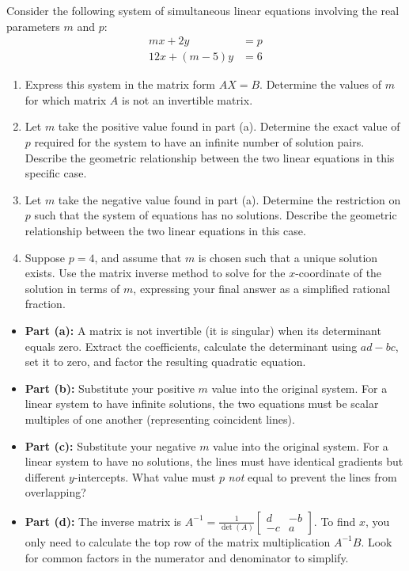 \begin{problem}
Consider the following system of simultaneous linear equations involving the real parameters $m$ and $p$:
\begin{align*}
mx + 2y &= p \\
12x + (m - 5)y &= 6
\end{align*}

\begin{enumerate}[label=\textbf{(\alph*)}]
    \item Express this system in the matrix form $AX = B$. Determine the values of $m$ for which matrix $A$ is not an invertible matrix.
    \item Let $m$ take the positive value found in part (a). Determine the exact value of $p$ required for the system to have an infinite number of solution pairs. Describe the geometric relationship between the two linear equations in this specific case.
    \item Let $m$ take the negative value found in part (a). Determine the restriction on $p$ such that the system of equations has no solutions. Describe the geometric relationship between the two linear equations in this case.
    \item Suppose $p = 4$, and assume that $m$ is chosen such that a unique solution exists. Use the matrix inverse method to solve for the $x$-coordinate of the solution in terms of $m$, expressing your final answer as a simplified rational fraction.
\end{enumerate}
\end{problem}

\begin{hint}
\begin{itemize}
    \item \textbf{Part (a):} A matrix is not invertible (it is singular) when its determinant equals zero. Extract the coefficients, calculate the determinant using $ad - bc$, set it to zero, and factor the resulting quadratic equation.
    \item \textbf{Part (b):} Substitute your positive $m$ value into the original system. For a linear system to have infinite solutions, the two equations must be scalar multiples of one another (representing coincident lines).
    \item \textbf{Part (c):} Substitute your negative $m$ value into the original system. For a linear system to have no solutions, the lines must have identical gradients but different $y$-intercepts. What value must $p$ \textit{not} equal to prevent the lines from overlapping?
    \item \textbf{Part (d):} The inverse matrix is $A^{-1} = \frac{1}{\det(A)} \begin{bmatrix} d & -b \\ -c & a \end{bmatrix}$. To find $x$, you only need to calculate the top row of the matrix multiplication $A^{-1}B$. Look for common factors in the numerator and denominator to simplify.
\end{itemize}
\end{hint}

